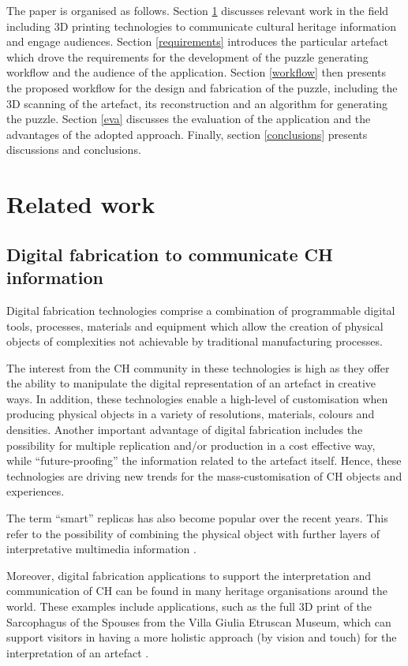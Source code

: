 \documentclass[acmlarge,screen]{acmart}
\begin{document}
The paper is organised as follows. Section \ref{related} discusses relevant work in the field including 3D printing technologies to communicate cultural heritage information and engage audiences. Section \ref{requirements} introduces the particular artefact which drove the requirements for the development of the puzzle generating workflow and the audience of the application. Section \ref{workflow} then presents the proposed workflow for the design and fabrication of the puzzle, including the 3D scanning of the artefact, its reconstruction and an algorithm for generating the puzzle. Section \ref{eva} discusses the evaluation of the application and the advantages of the adopted approach. Finally, section \ref{conclusions} presents discussions and conclusions.

\section{Related work}
\label{related}
\subsection{Digital fabrication to communicate CH information}
Digital fabrication technologies comprise a combination of programmable digital tools, processes, materials and equipment which allow the creation of physical objects of complexities not achievable by traditional manufacturing processes. 

The interest from the CH community in these technologies is high as they offer the ability to manipulate the digital representation of an artefact in creative ways. In addition, these technologies enable a high-level of customisation when producing physical objects in a variety of resolutions, materials, colours and densities. Another important advantage of digital fabrication includes the possibility for multiple replication and/or production in a cost effective way, while ``future-proofing'' the information related to the artefact itself. Hence, these technologies are driving new trends for the mass-customisation of CH objects and experiences.   

The term ``smart'' replicas has also become popular over the recent years. This refer to the possibility of combining the physical object with further layers of interpretative multimedia information \cite{Capurro2015,Marshall2016}. 

Moreover, digital fabrication applications to support the interpretation and communication of CH can be found in many heritage organisations around the world. These examples include applications, such as the full 3D print of the Sarcophagus of the Spouses from the Villa Giulia Etruscan Museum, which can support visitors in having a more holistic approach (by vision and touch) for the interpretation of an artefact \cite{Guidazzoli2014}.
\end{document}
